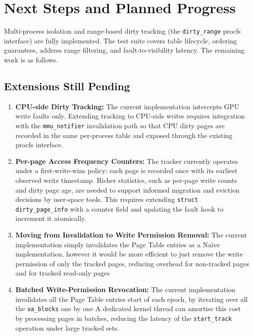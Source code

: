 \section*{Next Steps and Planned Progress}

Multi-process isolation and range-based dirty tracking (the \texttt{dirty\_range} procfs interface) are fully implemented.
The test suite covers table lifecycle, ordering guarantees, address range filtering, and
fault-to-visibility latency. The remaining work is as follows.

\subsection*{Extensions Still Pending}

\begin{enumerate}
      \item \textbf{CPU-side Dirty Tracking:}
            The current implementation intercepts GPU write faults only. Extending tracking to
            CPU-side writes requires integration with the \texttt{mmu\_notifier} invalidation
            path so that CPU dirty pages are recorded in the same per-process table and exposed
            through the existing procfs interface.

      \item \textbf{Per-page Access Frequency Counters:}
            The tracker currently operates under a first-write-wins policy: each page is recorded
            once with its earliest observed write timestamp. Richer statistics, such as per-page
            write counts and dirty page age, are needed to support informed migration and eviction
            decisions by user-space tools. This requires extending \texttt{struct dirty\_page\_info}
            with a counter field and updating the fault hook to increment it atomically.

      \item \textbf{Moving from Invalidation to Write Permission Removal:}
            The current implementation simply invalidates the Page Table entries as a Naive implementation,
            however it would be more efficient to just remove the write permission of only the tracked pages,
            reducing overhead for non-tracked pages and for tracked read-only pages
      \item \textbf{Batched Write-Permission Revocation:}
            The current implementation invalidates all the Page Table entries start of each epoch, 
            by iterating over all the \texttt{va\_blocks} one by one 
            A dedicated kernel thread can amortise this cost by
            processing pages in batches, reducing the latency of the \texttt{start\_track}
          operation under large tracked sets.
\end{enumerate}


